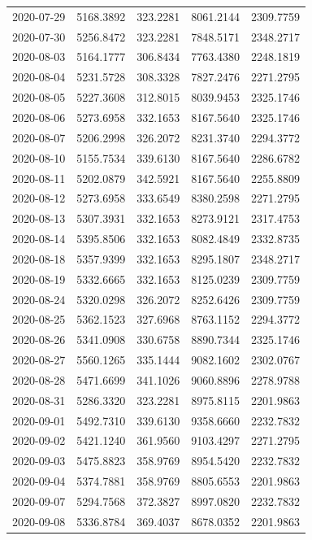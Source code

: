 {\begin{longtable}{lllll}
2020-07-29 & 5168.3892 & 323.2281 & 8061.2144 & 2309.7759 \\
2020-07-30 & 5256.8472 & 323.2281 & 7848.5171 & 2348.2717 \\
2020-08-03 & 5164.1777 & 306.8434 & 7763.4380 & 2248.1819 \\
2020-08-04 & 5231.5728 & 308.3328 & 7827.2476 & 2271.2795 \\
2020-08-05 & 5227.3608 & 312.8015 & 8039.9453 & 2325.1746 \\
2020-08-06 & 5273.6958 & 332.1653 & 8167.5640 & 2325.1746 \\
2020-08-07 & 5206.2998 & 326.2072 & 8231.3740 & 2294.3772 \\
2020-08-10 & 5155.7534 & 339.6130 & 8167.5640 & 2286.6782 \\
2020-08-11 & 5202.0879 & 342.5921 & 8167.5640 & 2255.8809 \\
2020-08-12 & 5273.6958 & 333.6549 & 8380.2598 & 2271.2795 \\
2020-08-13 & 5307.3931 & 332.1653 & 8273.9121 & 2317.4753 \\
2020-08-14 & 5395.8506 & 332.1653 & 8082.4849 & 2332.8735 \\
2020-08-18 & 5357.9399 & 332.1653 & 8295.1807 & 2348.2717 \\
2020-08-19 & 5332.6665 & 332.1653 & 8125.0239 & 2309.7759 \\
2020-08-24 & 5320.0298 & 326.2072 & 8252.6426 & 2309.7759 \\
2020-08-25 & 5362.1523 & 327.6968 & 8763.1152 & 2294.3772 \\
2020-08-26 & 5341.0908 & 330.6758 & 8890.7344 & 2325.1746 \\
2020-08-27 & 5560.1265 & 335.1444 & 9082.1602 & 2302.0767 \\
2020-08-28 & 5471.6699 & 341.1026 & 9060.8896 & 2278.9788 \\
2020-08-31 & 5286.3320 & 323.2281 & 8975.8115 & 2201.9863 \\
2020-09-01 & 5492.7310 & 339.6130 & 9358.6660 & 2232.7832 \\
2020-09-02 & 5421.1240 & 361.9560 & 9103.4297 & 2271.2795 \\
2020-09-03 & 5475.8823 & 358.9769 & 8954.5420 & 2232.7832 \\
2020-09-04 & 5374.7881 & 358.9769 & 8805.6553 & 2201.9863 \\
2020-09-07 & 5294.7568 & 372.3827 & 8997.0820 & 2232.7832 \\
2020-09-08 & 5336.8784 & 369.4037 & 8678.0352 & 2201.9863 \\

\end{longtable}}
